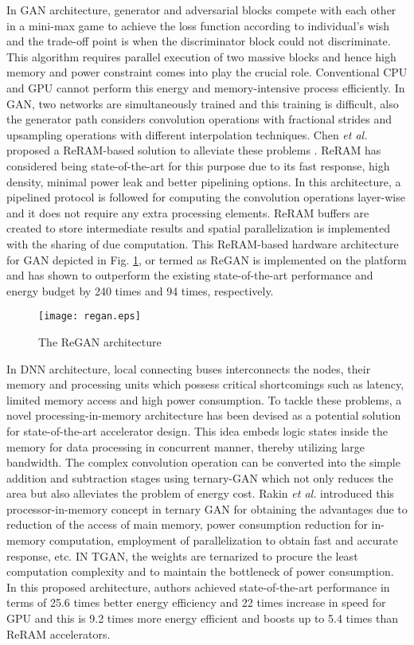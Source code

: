 \documentclass[journal]{IEEEtran}
\begin{document}
\par In GAN architecture, generator and adversarial blocks compete with each other in a mini-max game to achieve the loss function according to individual's wish and the trade-off point is when the discriminator block could not discriminate. This algorithm requires parallel execution of two massive blocks and hence high memory and power constraint comes into play the crucial role. Conventional CPU and GPU cannot perform this energy and memory-intensive process efficiently. In GAN, two networks are simultaneously trained and this training is difficult, also the generator path considers convolution operations with fractional strides and upsampling operations with different interpolation techniques. Chen \textit{et al.} proposed a ReRAM-based solution to alleviate these problems \cite{paper36}. ReRAM has considered being state-of-the-art for this purpose due to its fast response, high density, minimal power leak and better pipelining options. In this architecture, a pipelined protocol is followed for computing the convolution operations layer-wise and it does not require any extra processing elements. ReRAM buffers are created to store intermediate results and spatial parallelization is implemented with the sharing of due computation. This ReRAM-based hardware architecture for GAN depicted in Fig. \ref{fig:regan}, or termed as ReGAN is implemented on the platform and has shown to outperform the existing state-of-the-art performance and energy budget by 240 times and 94 times, respectively.  

\begin{figure}[t]
    \centering
    \texttt{[image: regan.eps]}
    \caption{The ReGAN architecture \cite{paper36}}
    \label{fig:regan}
\end{figure}

\par In DNN architecture, local connecting buses interconnects the nodes, their memory and processing units which possess critical shortcomings such as latency, limited memory access and high power consumption. To tackle these problems, a novel processing-in-memory architecture has been devised as a potential solution for state-of-the-art accelerator design. This idea embeds logic states inside the memory for data processing in concurrent manner, thereby utilizing large bandwidth. The complex convolution operation can be converted into the simple addition and subtraction stages using ternary-GAN which not only reduces the area but also alleviates the problem of energy cost. Rakin \textit{et al.} introduced this processor-in-memory concept in ternary GAN \cite{paper37} for obtaining the advantages due to reduction of the access of main memory, power consumption reduction for in-memory computation, employment of parallelization to obtain fast and accurate response, etc. IN TGAN, the weights are ternarized to procure the least computation complexity and to maintain the bottleneck of power consumption. In this proposed architecture, authors achieved state-of-the-art performance in terms of 25.6 times better energy efficiency and 22 times increase in speed for GPU and this is 9.2 times more energy efficient and boosts up to 5.4 times than ReRAM accelerators.  
\end{document}
